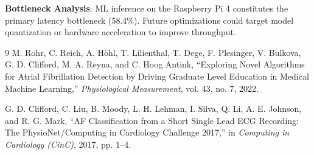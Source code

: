 \documentclass[10pt,twocolumn]{article}
\begin{document}
\textbf{Bottleneck Analysis}: ML inference on the Raspberry Pi 4 constitutes the primary latency bottleneck (58.4\%). Future optimizations could target model quantization or hardware acceleration to improve throughput.

\begin{thebibliography}{9}
\footnotesize
{}
M. Rohr, C. Reich, A. H{\"o}hl, T. Lilienthal, T. Dege, F. Plesinger, V. Bulkova, G. D. Clifford, M. A. Reyna, and C. Hoog Antink, ``Exploring Novel Algorithms for Atrial Fibrillation Detection by Driving Graduate Level Education in Medical Machine Learning,'' \textit{Physiological Measurement}, vol. 43, no. 7, 2022.

G. D. Clifford, C. Liu, B. Moody, L. H. Lehman, I. Silva, Q. Li, A. E. Johnson, and R. G. Mark, ``AF Classification from a Short Single Lead ECG Recording: The PhysioNet/Computing in Cardiology Challenge 2017,'' in \textit{Computing in Cardiology (CinC)}, 2017, pp. 1--4.
\end{thebibliography}
\end{document}
